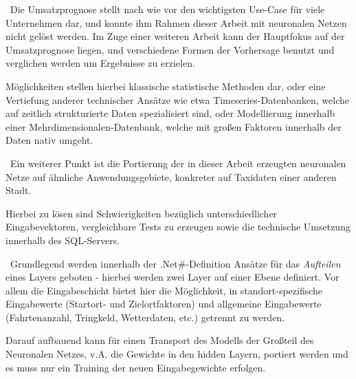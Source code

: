 ~\newline Die Umsatzprognose stellt nach wie vor den wichtigsten Use-Case für viele Unternehmen dar, und konnte ihm Rahmen dieser Arbeit mit neuronalen Netzen nicht gelöst werden. Im Zuge einer weiteren Arbeit kann der Hauptfokus auf der Umsatzprognose liegen, und verschiedene Formen der Vorhersage benutzt und verglichen werden um Ergebnisse zu erzielen. 

Möglichkeiten stellen hierbei klassische statistische Methoden dar, oder eine Vertiefung anderer technischer Ansätze wie etwa Timeseries-Datenbanken, welche auf zeitlich strukturierte Daten spezialisiert sind, oder Modellierung innerhalb einer Mehrdimensionalen-Datenbank, welche mit großen Faktoren innerhalb der Daten nativ umgeht.

~\newline Ein weiterer Punkt ist die Portierung der in dieser Arbeit erzeugten neuronalen Netze auf ähnliche Anwendungsgebiete, konkreter auf Taxidaten einer anderen Stadt. 

Hierbei zu lösen sind Schwierigkeiten bezüglich unterschiedlicher Eingabevektoren, vergleichbare Tests zu erzeugen sowie die technische Umsetzung innerhalb des SQL-Servers.  

~\newline Grundlegend werden innerhalb der .Net\#-Definition Ansätze für das \textit{Aufteilen} eines Layers geboten - hierbei werden zwei Layer auf einer Ebene definiert. Vor allem die Eingabeschicht bietet hier die Möglichkeit, in standort-spezifische Eingabewerte (Startort- und Zielortfaktoren) und allgemeine Eingabewerte (Fahrtenanzahl, Tringkeld, Wetterdaten, etc.) getrennt zu werden.

Darauf aufbauend kann für einen Transport des Modells der Großteil des Neuronalen Netzes, v.A. die Gewichte in den hidden Layern, portiert werden und es muss nur ein Training der neuen Eingabegewichte erfolgen.